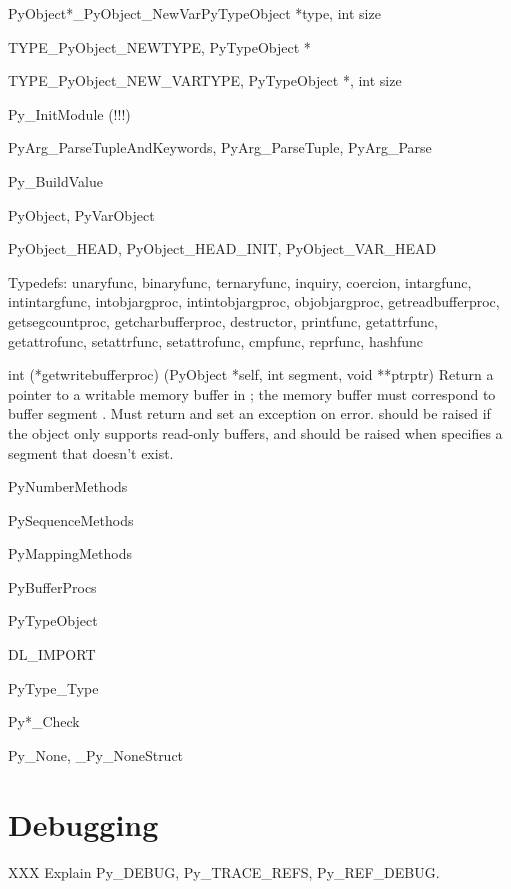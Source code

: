 \documentclass{manual}
\begin{document}
\begin{cfuncdesc}{PyObject*}{_PyObject_NewVar}{PyTypeObject *type, int size}
\end{cfuncdesc}

\begin{cfuncdesc}{TYPE}{_PyObject_NEW}{TYPE, PyTypeObject *}
\end{cfuncdesc}

\begin{cfuncdesc}{TYPE}{_PyObject_NEW_VAR}{TYPE, PyTypeObject *, int size}
\end{cfuncdesc}

Py_InitModule (!!!)

PyArg_ParseTupleAndKeywords, PyArg_ParseTuple, PyArg_Parse

Py_BuildValue

PyObject, PyVarObject

PyObject_HEAD, PyObject_HEAD_INIT, PyObject_VAR_HEAD

Typedefs:
unaryfunc, binaryfunc, ternaryfunc, inquiry, coercion, intargfunc,
intintargfunc, intobjargproc, intintobjargproc, objobjargproc,
getreadbufferproc, getsegcountproc, getcharbufferproc,
destructor, printfunc, getattrfunc, getattrofunc, setattrfunc,
setattrofunc, cmpfunc, reprfunc, hashfunc

\begin{ctypedesc}{int (*getwritebufferproc) (PyObject *self, int segment,
                                             void **ptrptr)}
Return a pointer to a writable memory buffer in ;
the memory buffer must correspond to buffer segment .
Must return  and set an exception on error.
 should be raised if the object only supports
read-only buffers, and  should be raised when
 specifies a segment that doesn't exist.
\end{ctypedesc}

PyNumberMethods

PySequenceMethods

PyMappingMethods

PyBufferProcs

PyTypeObject

DL_IMPORT

PyType_Type

Py*_Check

Py_None, _Py_NoneStruct


\chapter{Debugging \label{debugging}}

XXX Explain Py_DEBUG, Py_TRACE_REFS, Py_REF_DEBUG.


\end{document}
